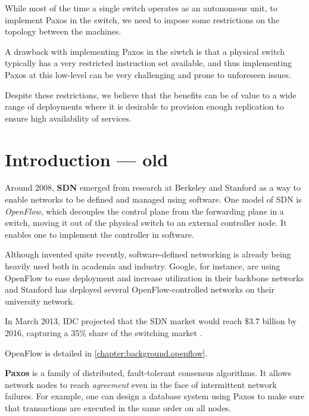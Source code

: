 While most of the time a single switch operates as an autonomous unit, to
implement Paxos in the switch, we need to impose some restrictions on the
topology between the machines.

A drawback with implementing Paxos in the siwtch is that a physical switch
typically has a very restricted instruction set available, and thus
implementing Paxos at this low-level can be very challenging and prone to
unforeseen issues.

Despite these restrictions, we believe that the benefits can be of value to
a wide range of deployments where it is desirable to provision enough
replication to ensure high availability of services.

\chapter{Introduction --- old}


Around 2008, \textbf{\acf{SDN}}
\cite{Casado:2005:VNS:1047344.1047383} emerged from research at
Berkeley and
Stanford as a way to enable networks to be defined and managed using
software. One model of \acs{SDN} is \textit{OpenFlow}, which
decouples the control plane from the forwarding
plane in a
switch, moving it out of the physical switch to an external controller node.
It enables one to implement the controller in software.

Although invented quite recently, software-defined networking is already
being heavily used both in academia and industry.  Google, for instance, are
using OpenFlow to ease deployment and increase utilization in their backbone
networks \cite{crabbe2012sdn} and Stanford has deployed several
OpenFlow-controlled networks on their university network.

In March 2013, IDC  projected that the SDN market would
  reach \${}3.7 billion by 2016, capturing a 35\%{} share of the switching
  market \cite{Kirkpatrick:2013:SN:2500468.2500473}.

OpenFlow is detailed in \vref{chapter:background.openflow}.

\textbf{Paxos} \cite{Lamport:1998:PP:279227.279229} is a
family of distributed, fault-tolerant consensus algorithms.  It allows
network nodes to reach \textit{agreement} even in the face of intermittent
network failures.  For example, one can design a database system using Paxos
to make sure that transactions are executed in the same order on all nodes.

